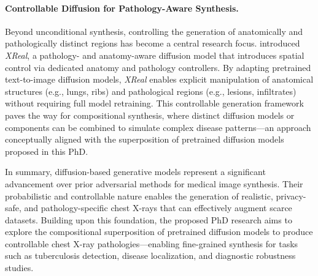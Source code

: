 \paragraph{Controllable Diffusion for Pathology-Aware Synthesis.}
Beyond unconditional synthesis, controlling the generation of anatomically and pathologically distinct regions has become a central research focus. 
\citet{hashmi2024xreal} introduced \textit{XReal}, a pathology- and anatomy-aware diffusion model that introduces spatial control via dedicated anatomy and pathology controllers. 
By adapting pretrained text-to-image diffusion models, \textit{XReal} enables explicit manipulation of anatomical structures (e.g., lungs, ribs) and pathological regions (e.g., lesions, infiltrates) without requiring full model retraining. 
This controllable generation framework paves the way for compositional synthesis, where distinct diffusion models or components can be combined to simulate complex disease patterns—an approach conceptually aligned with the superposition of pretrained diffusion models proposed in this PhD.


In summary, diffusion-based generative models represent a significant advancement over prior adversarial methods for medical image synthesis. 
Their probabilistic and controllable nature enables the generation of realistic, privacy-safe, and pathology-specific chest X-rays that can effectively augment scarce datasets. 
Building upon this foundation, the proposed PhD research aims to explore the compositional superposition of pretrained diffusion models to produce controllable chest X-ray pathologies—enabling fine-grained synthesis for tasks such as tuberculosis detection, disease localization, and diagnostic robustness studies. 
